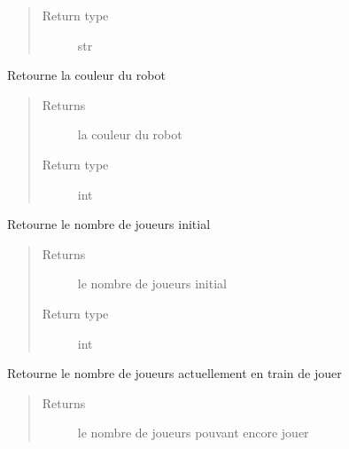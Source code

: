 \documentclass[letterpaper,10pt,english]{sphinxmanual}
\begin{document}
\begin{fulllineitems}
\begin{fulllineitems}
\begin{quote}
\begin{description}
\item[{Return type}] \leavevmode
str

\end{description}\end{quote}

\end{fulllineitems}


\begin{fulllineitems}
\label{index:Robot.Robot.getMaCouleur}
Retourne la couleur du robot
\begin{quote}\begin{description}
\item[{Returns}] \leavevmode
la couleur du robot

\item[{Return type}] \leavevmode
int

\end{description}\end{quote}

\end{fulllineitems}


\begin{fulllineitems}
\label{index:Robot.Robot.getNbJoueurInitial}
Retourne le nombre de joueurs initial
\begin{quote}\begin{description}
\item[{Returns}] \leavevmode
le nombre de joueurs initial

\item[{Return type}] \leavevmode
int

\end{description}\end{quote}

\end{fulllineitems}


\begin{fulllineitems}
\label{index:Robot.Robot.getNbJoueurs}
Retourne le nombre de joueurs actuellement en train de jouer
\begin{quote}\begin{description}
\item[{Returns}] \leavevmode
le nombre de joueurs pouvant encore jouer


\end{description}
\end{quote}
\end{fulllineitems}
\end{fulllineitems}
\end{document}
